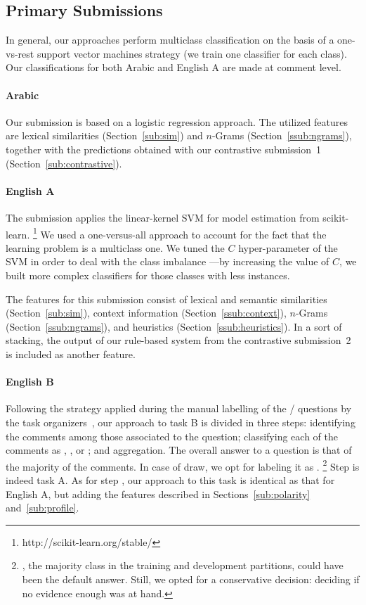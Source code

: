 \subsection{Primary Submissions}

In general, our approaches perform multiclass classification on the basis of a 
one-vs-rest support vector machines strategy (\ie we train one classifier for 
each class). Our classifications for both Arabic and English A are made at 
comment level.


\paragraph{Arabic} Our submission is based on a logistic regression approach. 
The utilized features are lexical similarities (Section~\ref{sub:sim}) and  
$n$-Grams (Section~\ref{ssub:ngrams}), together with the predictions obtained 
with our contrastive submission~1 (\cf Section~\ref{sub:contrastive}). 

\paragraph{English A}
The submission applies the linear-kernel SVM for model estimation from 
scikit-learn.%
\footnote{http://scikit-learn.org/stable/}
We used a one-versus-all approach to account for the fact that the learning 
problem is a multiclass one. We tuned the $C$ hyper-parameter of the SVM in 
order to deal with the class imbalance ---by increasing the value of $C$, we 
built more complex classifiers for those classes with less instances. 

The features for this submission consist of lexical and semantic similarities 
(Section~\ref{sub:sim}), context information (Section~\ref{ssub:context}), 
$n$-Grams (Section~\ref{ssub:ngrams}), and heuristics 
(Section~\ref{ssub:heuristics}). In a sort of stacking, the output of our 
rule-based system from the contrastive submission~2 is included as another 
feature. 

\paragraph{English B}

Following the strategy applied during the manual labelling of the \yes/\no 
questions by the task organizers~\cite{Marquez-EtAl:2015:SemEval}, our approach 
to task B is divided in three steps:
\Ni identifying the \good comments among those associated to the question;
\Nii classifying each of the \good comments as \yes, \no, or \unsure; and 
\Niii aggregation. 
The overall answer to a question is that of the majority of the comments. In 
case of draw, we opt for labeling it as \unsure.%
\footnote{\yes, the majority class in the training and development partitions, 
could have been the default answer. Still, we opted for a conservative decision: 
deciding \unsure if no evidence enough was at hand.}
Step \Ni is indeed task A. As for step \Nii, our approach to this task is 
identical as that for English A, but adding the features described in 
Sections~\ref{sub:polarity} and~\ref{sub:profile}.

